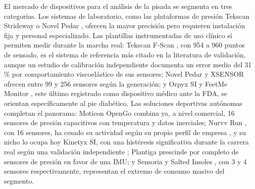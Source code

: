 \begin{IAtext}
El mercado de dispositivos para el análisis de la pisada se segmenta en tres categorías. Los sistemas de laboratorio, como las plataformas de presión Tekscan Strideway \cite{tekscan_strideway_product} o Novel Pedar \cite{novel_pedar_insole_details}, ofrecen la mayor precisión pero requieren instalación fija y personal especializado. Las plantillas instrumentadas de uso clínico sí permiten medir durante la marcha real: Tekscan F-Scan \cite{tekscan_fscan_3000e_datasheet}, con 954 a 960 puntos de sensado, es el sistema de referencia más citado en la literatura de validación, aunque un estudio de calibración independiente \cite{tekscan_fscan_calibration_dtic} documenta un error medio del 31\,\% por comportamiento viscoelástico de sus sensores; Novel Pedar y XSENSOR \cite{xsensor_intelligent_insoles_clinical_datasheet} ofrecen entre 99 y 256 sensores según la generación; y Orpyx SI \cite{orpyx_si_launch} y FeetMe Monitor \cite{feetme_monitor_gudid, feetme_one_preqin_profile}, este último registrado como dispositivo médico ante la FDA, se orientan específicamente al pie diabético. Las soluciones deportivas autónomas completan el panorama: Moticon OpenGo \cite{moticon_opengo_specs, moticon_opengo_launch} combina ya, a nivel comercial, 16 sensores de presión capacitivos con temperatura y datos inerciales; Nurvv Run \cite{nurvv_run_review_trendhunter}, con 16 sensores, ha cesado su actividad según su propio perfil de empresa \cite{nurvv_run_pitchbook_status}, y su nicho lo ocupa hoy Kinetyx SI, con una histéresis significativa durante la carrera real según una validación independiente \cite{kinetyx_si_validation_blades2023}; Plantiga \cite{plantiga_simplifaster_article, plantiga_validation_pmc_2021} prescinde por completo de sensores de presión en favor de una IMU; y Sensoria \cite{sensoria_socks_product_page} y Salted Insoles \cite{salted_insoles_fcc_filing}, con 3 y 4 sensores respectivamente, representan el extremo de consumo masivo del segmento.


\end{IAtext}

